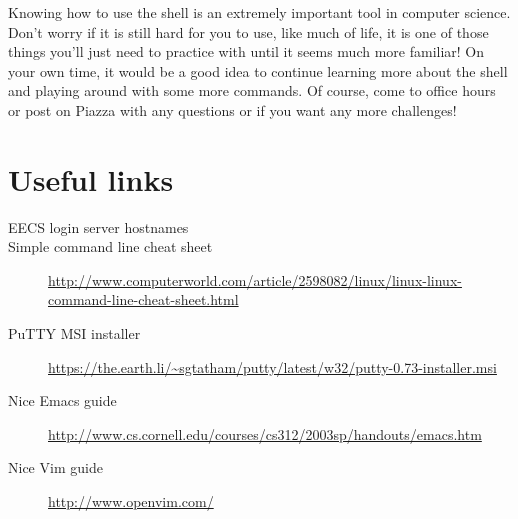 \documentclass{tufte-handout}
\def\PuTTYurl{https://the.earth.li/~sgtatham/putty/latest/w32/putty-0.73-installer.msi}
\begin{document}
Knowing how to use the shell is an extremely important tool in computer
science. Don't worry if it is still hard for you to use, like much of
life, it is one of those things you'll just need to practice with until
it seems much more familiar!  On your own time, it would be a good idea
to continue learning more about the shell and playing around with some
more commands.
Of course, come to office hours or post on Piazza with any questions or
if you want any more challenges!

\section{Useful links}

\begin{description}

\item[EECS login server hostnames]
\LabHostnamesLink

\item[Simple command line cheat sheet]
\url{http://www.computerworld.com/article/2598082/linux/linux-linux-command-line-cheat-sheet.html}

\item[PuTTY MSI installer]
\url{\PuTTYurl}

\item[Nice Emacs guide]
\url{http://www.cs.cornell.edu/courses/cs312/2003sp/handouts/emacs.htm}

\item[Nice Vim guide]
\url{http://www.openvim.com/}

\end{description}
\end{document}
